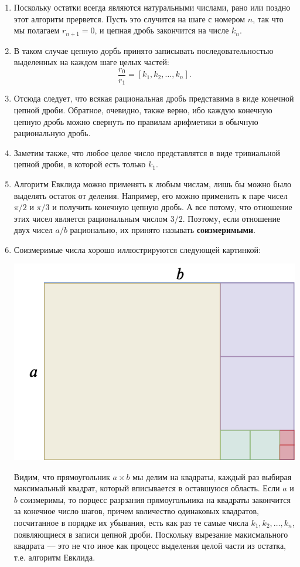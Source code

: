 \begin{enumerate}
\item Поскольку остатки всегда являются натуральными числами, рано или поздно этот алгоритм прервется. Пусть это случится на шаге с номером $n$, так что мы полагаем $r_{n+1}=0$, и цепная дробь закончится на числе $k_n$.
\item В таком случае цепную дорбь принято записывать последовательностью выделенных на каждом шаге целых частей:
$$
\frac{r_0}{r_1} = [k_1,k_2,\dots,k_n].
$$
\item Отсюда следует, что всякая рациональная дробь представима в виде конечной цепной дроби. Обратное, очевидно, также верно, ибо каждую конечную цепную дробь можно свернуть по правилам арифметики в обычную рациональную дробь.
\item Заметим также, что любое целое число представлятся в виде тривиальной цепной дроби, в которой есть только $k_1$.
\item Алгоритм Евклида можно применять к любым числам, лишь бы можно было выделять остаток от деления. Например, его можно применить к паре чисел $\pi/2$ и $\pi/3$ и получить конечную цепную дробь. А все потому, что отношение этих чисел является рациональным числом $3/2$. Поэтому, если отношение двух чисел $a/b$ рационально, их принято называть \textbf{соизмеримыми}.
\item\label{soizm} Соизмеримые числа хорошо иллюстрируются следующей картинкой:
\begin{center}
\includegraphics[scale=0.3]{soizmer.png}
\end{center}
Видим, что прямоугольник $a\times b$ мы делим на квадраты, каждый раз выбирая максимальный квадрат, который вписывается в оставшуюся область. Если $a$ и $b$ соизмеримы, то порцесс разрзания прямоугольника на квадраты закончится за конечное число шагов, причем количество одинаковых квадратов, посчитанное в порядке их убывания, есть как раз те самые числа $k_1,k_2,\dots,k_n$, появляющиеся в записи цепной дроби. Поскольку вырезание макисмального квадрата --- это не что иное как процесс выделения целой части из остатка, т.е. алгоритм Евклида.

\end{enumerate}
